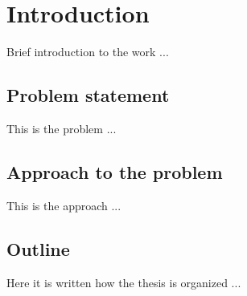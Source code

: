 \chapter{Introduction}
\label{cha:intro}
\vspace{0.5 cm} 

Brief introduction to the work ...

\vspace{0.5 cm} 
\section{Problem statement}
\label{sec:problem}
\vspace{0.5 cm} 

This is the problem ...


\vspace{0.5 cm} 
\section{Approach to the problem} 
\label{sec:approach}
\vspace{0.5 cm} 

This is the approach ...


\vspace{0.5 cm} 
\section{Outline} 
\label{sec:outline}
\vspace{0.5 cm} 

Here it is written how the thesis is organized ...
